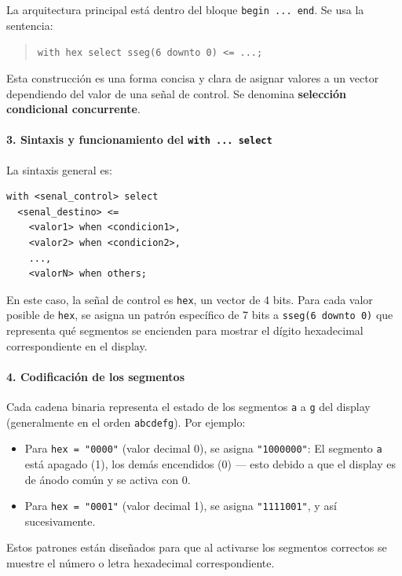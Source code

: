 \documentclass[a4paper,12pt]{article}
\begin{document}
La arquitectura principal está dentro del bloque \texttt{begin ... end}.  
Se usa la sentencia:

\begin{quote}
\texttt{with hex select sseg(6 downto 0) <= ...;}
\end{quote}

Esta construcción es una forma concisa y clara de asignar valores a un vector dependiendo del valor de una señal de control.  
Se denomina \textbf{selección condicional concurrente}.

\paragraph{3. Sintaxis y funcionamiento del \texttt{with ... select}}

La sintaxis general es:

\begin{lstlisting}[basicstyle=\ttfamily\footnotesize]
with <senal_control> select
  <senal_destino> <=
    <valor1> when <condicion1>,
    <valor2> when <condicion2>,
    ...,
    <valorN> when others;
\end{lstlisting}

En este caso, la señal de control es \texttt{hex}, un vector de 4 bits.  
Para cada valor posible de \texttt{hex}, se asigna un patrón específico de 7 bits a \texttt{sseg(6 downto 0)} que representa qué segmentos se encienden para mostrar el dígito hexadecimal correspondiente en el display.

\paragraph{4. Codificación de los segmentos}

Cada cadena binaria representa el estado de los segmentos \texttt{a} a \texttt{g} del display (generalmente en el orden \texttt{abcdefg}).  
Por ejemplo:

\begin{itemize}
  \item Para \texttt{hex = "0000"} (valor decimal 0), se asigna \texttt{"1000000"}:  
    El segmento \texttt{a} está apagado (1), los demás encendidos (0) — esto debido a que el display es de ánodo común y se activa con 0.
  \item Para \texttt{hex = "0001"} (valor decimal 1), se asigna \texttt{"1111001"}, y así sucesivamente.
\end{itemize}

Estos patrones están diseñados para que al activarse los segmentos correctos se muestre el número o letra hexadecimal correspondiente.
\end{document}
